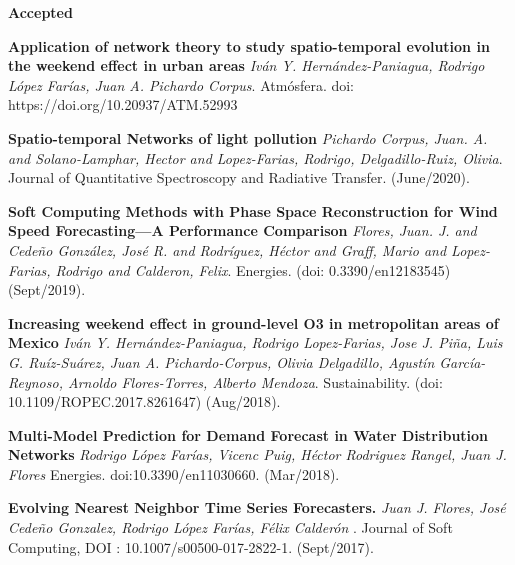 \documentclass[10pt]{article}
\newenvironment{innerlist}[1][\enskip\textbullet]%
        {\begin{compactitem}[#1]}{\end{compactitem}}
\begin{document}
\textbf{Accepted}

\begin{innerlist}
\item \textbf{Application of network theory to study spatio-temporal evolution in
the weekend effect in urban areas} \textit{Iván Y. Hernández-Paniagua, Rodrigo López Farías, Juan A. Pichardo Corpus}. Atmósfera. doi: https://doi.org/10.20937/ATM.52993

\item \textbf{Spatio-temporal Networks of light pollution} \textit{{Pichardo Corpus, Juan. A. and Solano-Lamphar, Hector and Lopez-Farias, Rodrigo, Delgadillo-Ruiz, Olivia}}. {Journal of Quantitative Spectroscopy and Radiative Transfer}. ({June/2020}).

\item \textbf{Soft Computing Methods with Phase Space Reconstruction for Wind Speed Forecasting—A Performance Comparison} \textit{{Flores, Juan. J. and Cedeño González, José R. and Rodríguez, Héctor and Graff, Mario and Lopez-Farias, Rodrigo and Calderon, Felix}}. {Energies}. (doi: 0.3390/en12183545) ({Sept/2019}).

\item \textbf{Increasing weekend effect in ground-level O3 in metropolitan areas of Mexico} \textit{Iván Y. Hernández-Paniagua, Rodrigo Lopez-Farias, Jose J. Piña, Luis G. Ruíz-Suárez, Juan A. Pichardo-Corpus, Olivia Delgadillo, Agustín García-Reynoso, Arnoldo Flores-Torres, Alberto Mendoza}. {Sustainability}. (doi: 10.1109/ROPEC.2017.8261647) ({Aug/2018}).

\item \textbf{Multi-Model Prediction for Demand Forecast in
Water Distribution Networks} \textit{Rodrigo López Farías, Vicenc Puig, Héctor Rodriguez Rangel, Juan J. Flores} {Energies}. doi:10.3390/en11030660. ({Mar/2018}).

\item  \textbf{Evolving Nearest Neighbor Time Series Forecasters.} \textit{Juan J. Flores, José Cede\~no Gonzalez, Rodrigo López Farías, Félix Calderón }.  {Journal of Soft Computing},
DOI : 10.1007/s00500-017-2822-1. (Sept/2017).


\end{innerlist}
\end{document}
